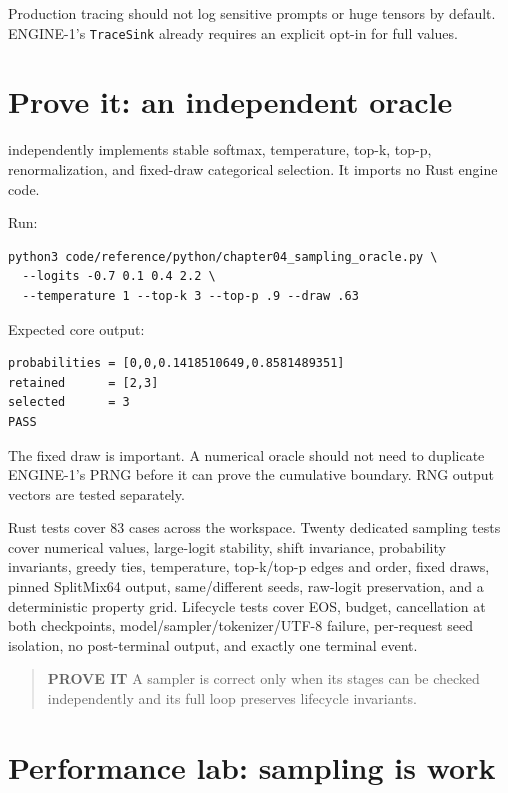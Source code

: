 Production tracing should not log sensitive prompts or huge tensors by
default. ENGINE-1's \texttt{TraceSink} already requires an explicit
opt-in for full values.

\section{Prove it: an independent
oracle}\label{prove-it-an-independent-oracle}

\texttt{}
independently implements stable softmax, temperature, top-k, top-p,
renormalization, and fixed-draw categorical selection. It imports no
Rust engine code.

Run:

\begin{verbatim}
python3 code/reference/python/chapter04_sampling_oracle.py \
  --logits -0.7 0.1 0.4 2.2 \
  --temperature 1 --top-k 3 --top-p .9 --draw .63
\end{verbatim}

Expected core output:

\begin{verbatim}
probabilities = [0,0,0.1418510649,0.8581489351]
retained      = [2,3]
selected      = 3
PASS
\end{verbatim}

The fixed draw is important. A numerical oracle should not need to
duplicate ENGINE-1's PRNG before it can prove the cumulative boundary.
RNG output vectors are tested separately.

Rust tests cover 83 cases across the workspace. Twenty dedicated
sampling tests cover numerical values, large-logit stability, shift
invariance, probability invariants, greedy ties, temperature,
top-k/top-p edges and order, fixed draws, pinned SplitMix64 output,
same/different seeds, raw-logit preservation, and a deterministic
property grid. Lifecycle tests cover EOS, budget, cancellation at both
checkpoints, model/sampler/tokenizer/UTF-8 failure, per-request seed
isolation, no post-terminal output, and exactly one terminal event.

\begin{quote}
\textbf{PROVE IT} A sampler is correct only when its stages can be
checked independently and its full loop preserves lifecycle invariants.
\end{quote}

\section{Performance lab: sampling is
work}\label{performance-lab-sampling-is-work}

